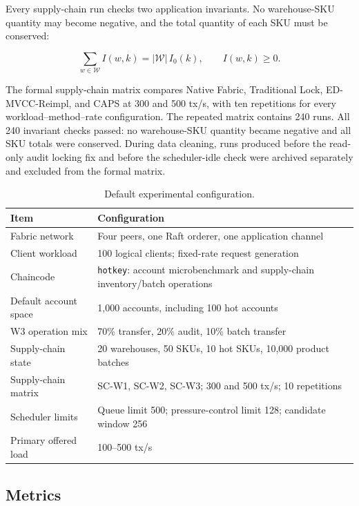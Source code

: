\documentclass[fleqn,10pt,lineno]{wlpeerj}
\begin{document}
Every supply-chain run checks two application invariants. No warehouse-SKU quantity may become negative, and the total quantity of each SKU must be conserved:

\begin{equation}
\sum_{w\in\mathcal{W}} I(w,k)=|\mathcal{W}|\,I_0(k),\qquad I(w,k)\ge0.
\label{eq:inventory-invariant}
\end{equation}

The formal supply-chain matrix compares Native Fabric, Traditional Lock, ED-MVCC-Reimpl, and CAPS at 300 and 500 tx/s, with ten repetitions for every workload--method--rate configuration. The repeated matrix contains 240 runs. All 240 invariant checks passed: no warehouse-SKU quantity became negative and all SKU totals were conserved. During data cleaning, runs produced before the read-only audit locking fix and before the scheduler-idle check were archived separately and excluded from the formal matrix.

\begin{table}[ht]
\centering
\caption{Default experimental configuration.}
\label{tab:setup}
\begin{tabularx}{\linewidth}{@{}lX@{}}
\toprule
Item & Configuration \\
\midrule
Fabric network & Four peers, one Raft orderer, one application channel \\
Client workload & 100 logical clients; fixed-rate request generation \\
Chaincode & \texttt{hotkey}: account microbenchmark and supply-chain inventory/batch operations \\
Default account space & 1,000 accounts, including 100 hot accounts \\
W3 operation mix & 70\% transfer, 20\% audit, 10\% batch transfer \\
Supply-chain state & 20 warehouses, 50 SKUs, 10 hot SKUs, 10,000 product batches \\
Supply-chain matrix & SC-W1, SC-W2, SC-W3; 300 and 500 tx/s; 10 repetitions \\
Scheduler limits & Queue limit 500; pressure-control limit 128; candidate window 256 \\
Primary offered load & 100--500 tx/s \\
\bottomrule
\end{tabularx}
\end{table}

\subsection*{Metrics}
\end{document}
